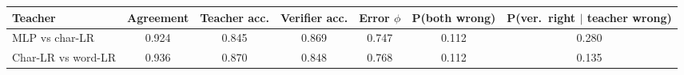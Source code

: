 \begin{tabular}{lcccccc}
\toprule
Teacher & Agreement & Teacher acc. & Verifier acc. & Error $\phi$ & P(both wrong) & P(ver.\ right $|$ teacher wrong) \\
\midrule
MLP vs char-LR & 0.924 & 0.845 & 0.869 & 0.747 & 0.112 & 0.280 \\
Char-LR vs word-LR & 0.936 & 0.870 & 0.848 & 0.768 & 0.112 & 0.135 \\
\bottomrule
\end{tabular}
